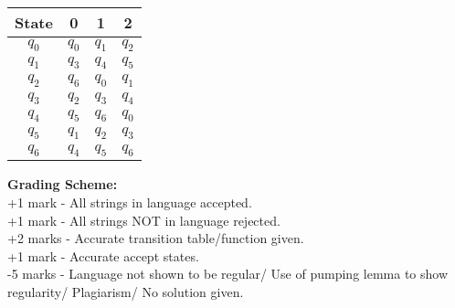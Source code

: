\documentclass[11pt, article, oneside]{memoir}
\begin{document}
\begin{enumerate}
\begin{center}
        \end{center}
        \begin{center}
        \begin{tabular}{|c|c|c|c|} 
            \hline
            State & 0 & 1 & 2\\
            \hline
            \(q_0\) & \(q_0\) & \(q_1\) & \(q_2\)\\ 
            \hline
            \(q_1\) & \(q_3\) & \(q_4\) & \(q_5\)\\ 
            \hline
            \(q_2\) & \(q_6\) & \(q_0\) & \(q_1\)\\ 
            \hline
            \(q_3\) & \(q_2\) & \(q_3\) & \(q_4\)\\ 
            \hline
            \(q_4\) & \(q_5\) & \(q_6\) & \(q_0\)\\ 
            \hline
            \(q_5\) & \(q_1\) & \(q_2\) & \(q_3\)\\ 
            \hline
            \(q_6\) & \(q_4\) & \(q_5\) & \(q_6\)\\ 
            \hline
        \end{tabular}
        \end{center}

        \textbf{Grading Scheme:}
        \\+1 mark - All strings in language accepted.
        \\+1 mark - All strings NOT in language rejected.
        \\+2 marks - Accurate transition table/function given.
        \\+1 mark - Accurate accept states.
        \\-5 marks -  Language not shown to be regular/ Use of pumping lemma to show regularity/ Plagiarism/ No solution given.
        

\end{enumerate}
\end{document}
